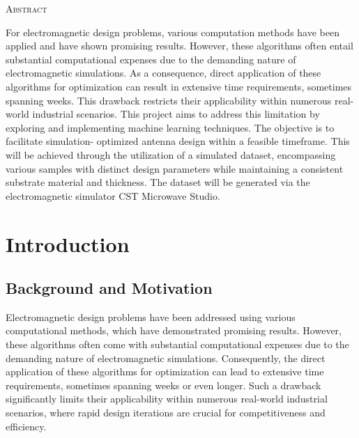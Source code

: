 \documentclass[a4paper,12pt]{report}
\begin{document}
\pagebreak
\begin{center}
\huge{\textsc{Abstract}}
\end{center}
For electromagnetic design problems, various computation methods have
been applied and have shown promising results. However, these
algorithms often entail substantial computational expenses due to the
demanding nature of electromagnetic simulations. As a consequence,
direct application of these algorithms for optimization can result in
extensive time requirements, sometimes spanning weeks. This drawback
restricts their applicability within numerous real-world industrial scenarios.
This project aims to address this limitation by exploring and implementing
machine learning techniques. The objective is to facilitate simulation-
optimized antenna design within a feasible timeframe. This will be achieved
through the utilization of a simulated dataset, encompassing various
samples with distinct design parameters while maintaining a consistent
substrate material and thickness. The dataset will be generated via the
electromagnetic simulator CST Microwave Studio.
\pagebreak
\tableofcontents
\pagebreak
\listoffigures
\pagebreak
\listoftables
\pagebreak




\chapter{Introduction}
\label{chap:introduction}

\section{Background and Motivation}
Electromagnetic design problems have been addressed using various computational methods, which have demonstrated promising results. However, these algorithms often come with substantial computational expenses due to the demanding nature of electromagnetic simulations. Consequently, the direct application of these algorithms for optimization can lead to extensive time requirements, sometimes spanning weeks or even longer. Such a drawback significantly limits their applicability within numerous real-world industrial scenarios, where rapid design iterations are crucial for competitiveness and efficiency.
\end{document}
